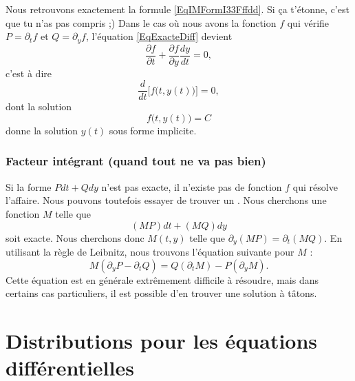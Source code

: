 Nous retrouvons exactement la formule \eqref{EqIMFormI33Fffdd}. Si ça t'étonne, c'est que tu n'as pas compris ;) Dans le cas où nous avons la fonction $f$ qui vérifie $P=\partial_tf$ et $Q=\partial_yf$, l'équation \eqref{EqExacteDiff} devient
\begin{equation}
	\frac{ \partial f }{ \partial t }+\frac{ \partial f }{ \partial y }\frac{ dy }{ dt }=0,
\end{equation}
c'est à dire 
\begin{equation}
	\frac{ d }{ dt }\Big[ f\big( t,y(t) \big) \Big]=0,
\end{equation}
dont la solution
\begin{equation}
	f\big( t,y(t) \big)=C
\end{equation}
donne la solution $y(t)$ sous forme implicite.

					\subsubsection{Facteur intégrant (quand tout ne va pas bien)}

Si la forme $Pdt+Qdy$ n'est pas exacte, il n'existe pas de fonction $f$ qui résolve l'affaire. Nous pouvons toutefois essayer de trouver un . Nous cherchons une fonction $M$ telle que
\begin{equation}
	(MP)dt+(MQ)dy
\end{equation}
soit exacte. Nous cherchons donc $M(t,y)$ telle que $\partial_y(MP)=\partial_t(MQ)$. En utilisant la règle de Leibnitz, nous trouvons l'équation suivante pour $M$ :
\begin{equation}		\label{EqDuFacteurIntegrant}
	M(\partial_yP-\partial_tQ)=Q(\partial_tM)-P(\partial_yM).
\end{equation}
Cette équation est en générale extrêmement difficile à résoudre, mais dans certains cas particuliers, il est possible d'en trouver une solution à tâtons.

\section{Distributions pour les équations différentielles}
\label{SecTNgeNms}

